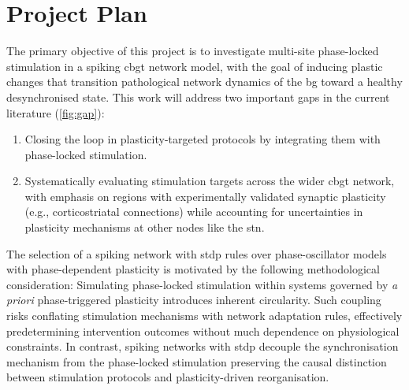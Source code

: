 \section{Project Plan}
The primary objective of this project is to investigate multi-site phase-locked stimulation in a spiking \acrshort{cbgt} network
model, with the goal of inducing plastic changes that transition pathological network dynamics of the \acrshort{bg} toward
a healthy desynchronised state. This work will address two important gaps in the current literature (\cref{fig:gap}):
\begin{enumerate}[nosep]
	\item Closing the loop in plasticity-targeted protocols by integrating them with phase-locked stimulation.
	\item Systematically evaluating stimulation targets across the wider \acrshort{cbgt} network, with emphasis on regions with
	      experimentally validated synaptic plasticity (e.g., corticostriatal connections) while accounting for
	      uncertainties in plasticity mechanisms at other nodes like the \acrshort{stn}.
\end{enumerate}
The selection of a spiking network with \acrshort{stdp} rules over phase-oscillator models with phase-dependent plasticity is
motivated by the following methodological consideration:
Simulating phase-locked stimulation within systems governed by \textit{a priori} phase-triggered plasticity introduces
inherent circularity.
Such coupling risks conflating stimulation mechanisms with network adaptation rules, effectively predetermining
intervention outcomes without much dependence on physiological constraints.
In contrast, spiking networks with \acrshort{stdp} decouple the synchronisation mechanism from the phase-locked stimulation
preserving the causal distinction between stimulation protocols and plasticity-driven reorganisation.

